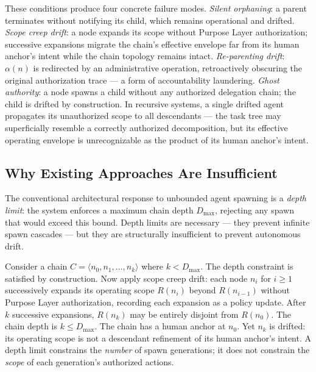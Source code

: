 These conditions produce four concrete failure modes. \emph{Silent orphaning}: a parent terminates without notifying its child, which remains operational and drifted. \emph{Scope creep drift}: a node expands its scope without Purpose Layer authorization; successive expansions migrate the chain's effective envelope far from its human anchor's intent while the chain topology remains intact. \emph{Re-parenting drift}: $\alpha(n)$ is redirected by an administrative operation, retroactively obscuring the original authorization trace — a form of accountability laundering. \emph{Ghost authority}: a node spawns a child without any authorized delegation chain; the child is drifted by construction. In recursive systems, a single drifted agent propagates its unauthorized scope to all descendants — the task tree may superficially resemble a correctly authorized decomposition, but its effective operating envelope is unrecognizable as the product of its human anchor's intent.

\subsection{Why Existing Approaches Are Insufficient}

The conventional architectural response to unbounded agent spawning is a \emph{depth limit}: the system enforces a maximum chain depth $D_{\max}$, rejecting any spawn that would exceed this bound. Depth limits are necessary — they prevent infinite spawn cascades — but they are structurally insufficient to prevent autonomous drift.

Consider a chain $C = \langle n_0, n_1, \ldots, n_k \rangle$ where $k < D_{\max}$. The depth constraint is satisfied by construction. Now apply scope creep drift: each node $n_i$ for $i \geq 1$ successively expands its operating scope $R(n_i)$ beyond $R(n_{i-1})$ without Purpose Layer authorization, recording each expansion as a policy update. After $k$ successive expansions, $R(n_k)$ may be entirely disjoint from $R(n_0)$. The chain depth is $k \leq D_{\max}$. The chain has a human anchor at $n_0$. Yet $n_k$ is drifted: its operating scope is not a descendant refinement of its human anchor's intent. A depth limit constrains the \emph{number} of spawn generations; it does not constrain the \emph{scope} of each generation's authorized actions.

